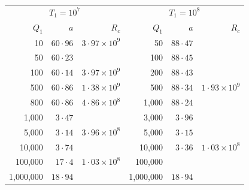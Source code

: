 \begin{table}[p]
\bigskip
\begin{tabular}{r@{\quad}r@{\quad}r|r@{\quad}r@{\quad}r}
\hline
\multicolumn{3}{c|}{$T_1 = 10^{7}$} & \multicolumn{3}{c}{$T_1 = 10^{8}$} \\
$Q_1$ & $a$ & $R_c$ & $Q_1$ & $a$ & $R_c$ \\
\hline
 10   & $60{\cdot}96$ & $3{\cdot}97\times10^{9}$ & 50   & $88{\cdot}47$ &           \\
 50   & $60{\cdot}23$ &                          & 100  & $88{\cdot}45$ &           \\
 100  & $60{\cdot}14$ & $3{\cdot}97\times10^{9}$ & 200  & $88{\cdot}43$ &           \\
 500  & $60{\cdot}86$ & $1{\cdot}38\times10^{9}$ & 500  & $88{\cdot}34$ &$1{\cdot}93\times10^{9}$\\
 800  & $60{\cdot}86$ & $4{\cdot}86\times10^{8}$ & 1{,}000 & $88{\cdot}24$ &       \\
 1{,}000 & $3{\cdot}47$ &                       & 3{,}000 & $3{\cdot}96$ &          \\
 5{,}000 & $3{\cdot}14$ &$3{\cdot}96\times10^{8}$& 5{,}000 & $3{\cdot}15$ &        \\
 10{,}000 & $3{\cdot}74$ &                      & 10{,}000 & $3{\cdot}36$ &$1{\cdot}03\times10^{8}$\\
 100{,}000 & $17{\cdot}4$ & $1{\cdot}03\times10^{8}$ & 100{,}000 &         &        \\
 1{,}000{,}000 & $18{\cdot}94$ &                & 1{,}000{,}000 &$18{\cdot}94$&     \\
\hline
\end{tabular}


\end{table}
